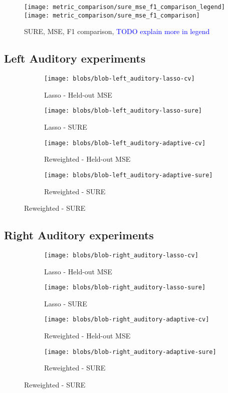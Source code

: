 \begin{figure}[h]
    \centering
    \texttt{[image: metric\_comparison/sure\_mse\_f1\_comparison\_legend]}
    \texttt{[image: metric\_comparison/sure\_mse\_f1\_comparison]}
    \caption{SURE, MSE, F1 comparison, \textcolor{blue}{TODO explain more in legend}}
    \label{fig:sure_mse_f1_comparison}
\end{figure}

\subsection{Left Auditory experiments}

\begin{figure}
    \centering
    \begin{subfigure}{6cm}
        \centering \texttt{[image: blobs/blob-left\_auditory-lasso-cv]}
        \caption{Lasso - Held-out MSE}
    \end{subfigure}
    \begin{subfigure}{6cm}
        \centering \texttt{[image: blobs/blob-left\_auditory-lasso-sure]}
        \caption{Lasso - SURE}
    \end{subfigure}

    \begin{subfigure}{6cm}
        \centering \texttt{[image: blobs/blob-left\_auditory-adaptive-cv]}
        \caption{Reweighted - Held-out MSE}
    \end{subfigure}
    \begin{subfigure}{6cm}
        \centering \texttt{[image: blobs/blob-left\_auditory-adaptive-sure]}
        \caption{Reweighted - SURE}
    \end{subfigure}
\end{figure}


\subsection{Right Auditory experiments}

\begin{figure}
    \centering
    \begin{subfigure}{6cm}
        \centering \texttt{[image: blobs/blob-right\_auditory-lasso-cv]}
        \caption{Lasso - Held-out MSE}
    \end{subfigure}
    \begin{subfigure}{6cm}
        \centering \texttt{[image: blobs/blob-right\_auditory-lasso-sure]}
        \caption{Lasso - SURE}
    \end{subfigure}

    \begin{subfigure}{6cm}
        \centering \texttt{[image: blobs/blob-right\_auditory-adaptive-cv]}
        \caption{Reweighted - Held-out MSE}
    \end{subfigure}
    \begin{subfigure}{6cm}
        \centering \texttt{[image: blobs/blob-right\_auditory-adaptive-sure]}
        \caption{Reweighted - SURE}
    \end{subfigure}
\end{figure}


